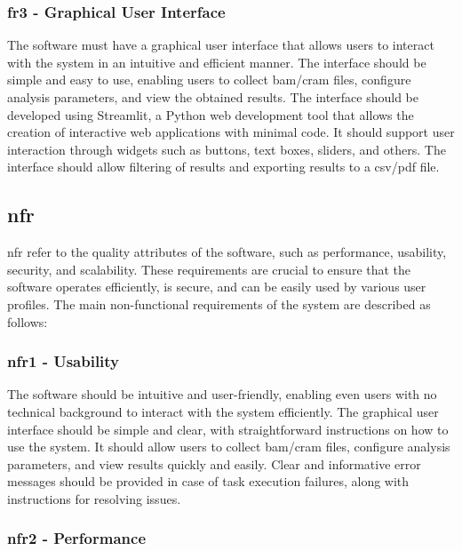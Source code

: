 \subsubsection{\textbf{\ac{fr}3 - Graphical User Interface}}

The software must have a graphical user interface that allows users to interact with the system in an intuitive and efficient manner. The interface should be simple and easy to use, enabling users to collect \ac{bam}/\ac{cram} files, configure analysis parameters, and view the obtained results. The interface should be developed using Streamlit, a Python web development tool that allows the creation of interactive web applications with minimal code. It should support user interaction through widgets such as buttons, text boxes, sliders, and others. The interface should allow filtering of results and exporting results to a \ac{csv}/\ac{pdf} file.

\subsection{\acl{nfr}}

\ac{nfr} refer to the quality attributes of the software, such as performance, usability, security, and scalability. These requirements are crucial to ensure that the software operates efficiently, is secure, and can be easily used by various user profiles. \cite{Geeks2024} The main non-functional requirements of the system are described as follows:

\subsubsection{\textbf{\ac{nfr}1 - Usability}}

The software should be intuitive and user-friendly, enabling even users with no technical background to interact with the system efficiently. The graphical user interface should be simple and clear, with straightforward instructions on how to use the system. It should allow users to collect \ac{bam}/\ac{cram} files, configure analysis parameters, and view results quickly and easily. Clear and informative error messages should be provided in case of task execution failures, along with instructions for resolving issues.

\subsubsection{\textbf{\ac{nfr}2 - Performance}}

